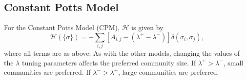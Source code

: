 \documentclass[11pt]{article}
\begin{document}
\subsection{Constant Potts Model}\label{appendix:CPModel}

For the Constant Potts Model (CPM), $\mathcal{H}$ is given by
\begin{equation}\label{eq:CNModel2}
\mathcal{H}(\{\sigma\}) = - \displaystyle\sum_{i,j} \left[A_{i,j} -  \left(\lambda^{+} - \lambda^{-}\right)\right]\delta(\sigma_{i}, \sigma_{j}),
\end{equation}
where all terms are as above. As with the other models, changing the values of the $\lambda$ tuning
parameters affects the preferred community size. If $\lambda^{+} > \lambda^{-}$, small communities are preferred. If $\lambda^{-} > \lambda^{+}$, large communities are preferred. \\


\newpage
\end{document}
